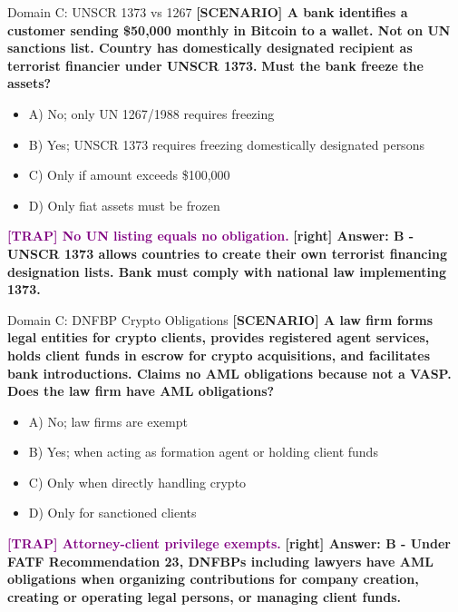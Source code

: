 \documentclass[11pt,a4paper]{beamer}
\newcommand{\trap}[1]{\textcolor{purple}{\textbf{[TRAP] #1}}}
\newcommand{\correct}[1]{\textcolor{green!50!black}{\textbf{[right] #1}}}
\newcommand{\scenario}[1]{\textcolor{blue!70!black}{\textbf{[SCENARIO] #1}}}
\begin{document}
\begin{frame}{Domain C: UNSCR 1373 vs 1267}
\scenario{A bank identifies a customer sending \$50,000 monthly in Bitcoin to a wallet. Not on UN sanctions list. Country has domestically designated recipient as terrorist financier under UNSCR 1373.}
\vspace{0.2cm}
\textbf{Must the bank freeze the assets?}
\vspace{0.2cm}
\begin{itemize}
    \item A) No; only UN 1267/1988 requires freezing
    \item B) Yes; UNSCR 1373 requires freezing domestically designated persons
    \item C) Only if amount exceeds \$100,000
    \item D) Only fiat assets must be frozen
\end{itemize}
\vspace{0.2cm}
\trap{No UN listing equals no obligation.}
\correct{Answer: B - UNSCR 1373 allows countries to create their own terrorist financing designation lists. Bank must comply with national law implementing 1373.}
\end{frame}

\begin{frame}{Domain C: DNFBP Crypto Obligations}
\scenario{A law firm forms legal entities for crypto clients, provides registered agent services, holds client funds in escrow for crypto acquisitions, and facilitates bank introductions. Claims no AML obligations because not a VASP.}
\vspace{0.2cm}
\textbf{Does the law firm have AML obligations?}
\vspace{0.2cm}
\begin{itemize}
    \item A) No; law firms are exempt
    \item B) Yes; when acting as formation agent or holding client funds
    \item C) Only when directly handling crypto
    \item D) Only for sanctioned clients
\end{itemize}
\vspace{0.2cm}
\trap{Attorney-client privilege exempts.}
\correct{Answer: B - Under FATF Recommendation 23, DNFBPs including lawyers have AML obligations when organizing contributions for company creation, creating or operating legal persons, or managing client funds.}
\end{frame}
\end{document}
